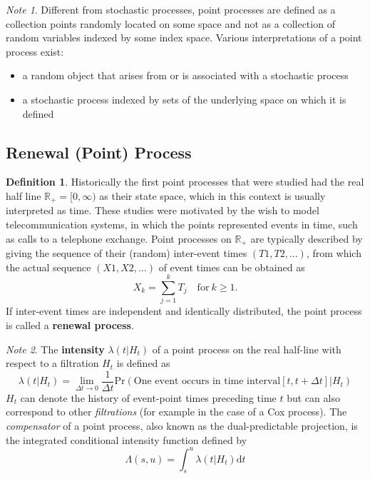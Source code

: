 \documentclass[12pt]{article}
\theoremstyle{plain}
\theoremstyle{definition}
\newtheorem{definition}{Definition}
\theoremstyle{remark}
\newtheorem*{note}{Note}
\begin{document}
\begin{note}
  Different from stochastic processes, point processes are defined as a
  collection points randomly located on some space and not as a collection of
  random variables indexed by some index space.
  Various interpretations of a point process exist:
  \begin{itemize}
  \item a random object that arises from or is associated with a stochastic
    process
  \item a stochastic process indexed by sets of the underlying space on which it
    is defined
  \end{itemize}
\end{note}

\subsection{Renewal (Point) Process}

\begin{definition}
  Historically the first point processes that were studied had the real half
  line $\mathbb{R}_+ = [0,\infty)$ as their state space, which in this context
  is usually interpreted as time.
  These studies were motivated by the wish to model telecommunication systems,
  in which the points represented events in time, such as calls to a telephone
  exchange.
  Point processes on $\mathbb{R}_+$ are typically described by giving the
  sequence of their (random) inter-event times $(T1,T2,\dots)$, from which the
  actual sequence $(X1,X2,\dots)$ of event times can be obtained as
  \begin{equation*}
    X_k = \sum_{j=1}^{k} T_j\quad \text{for}\ k \geq 1.
  \end{equation*}
  If inter-event times are independent and identically distributed, the point
  process is called a \textbf{renewal process}.
\end{definition}

\begin{note}
  The \textbf{intensity} $\lambda(t|H_t)$ of a point process on the real
  half-line with respect to a filtration $H_t$ is defined as
  \begin{equation*}
    \lambda(t|H_t) = \lim_{\Delta t \to 0} \frac{1}{\Delta t} \mathrm{Pr}
    (\text{One event occurs in time interval} [t, t+\Delta t] | H_t)
  \end{equation*}
  $H_t$ can denote the history of event-point times preceding time $t$ but can
  also correspond to other \emph{filtrations} (for example in the case of a Cox
  process).
  The \emph{compensator} of a point process, also known as the dual-predictable
  projection, is the integrated conditional intensity function defined by
  \begin{equation*}
    \Lambda(s,u) = \int_s^u \lambda(t|H_t)\mathrm{d}t
  \end{equation*}
\end{note}
\end{document}

